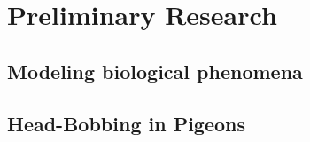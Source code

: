 \section{Preliminary Research}
\subsection{Modeling biological phenomena}

\subsection{Head-Bobbing in Pigeons}
